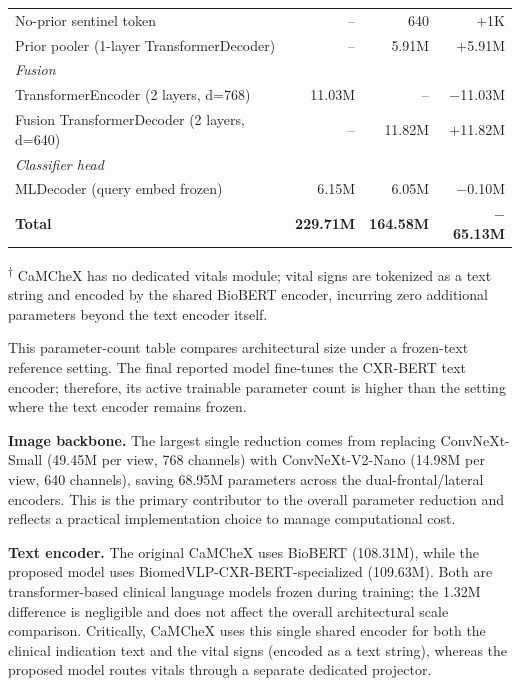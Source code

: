 \begin{table}[H]
{\begin{tabular}{lrrr}
        \quad No-prior sentinel token & -- & 640 & $+$1K \\
        \quad Prior pooler (1-layer TransformerDecoder) & -- & 5.91M & $+$5.91M \\
        \midrule
        \multicolumn{4}{l}{\textit{Fusion}} \\
        \quad TransformerEncoder (2 layers, d=768) & 11.03M & -- & $-$11.03M \\
        \quad Fusion TransformerDecoder (2 layers, d=640) & -- & 11.82M & $+$11.82M \\
        \midrule
        \multicolumn{4}{l}{\textit{Classifier head}} \\
        \quad MLDecoder (query embed frozen) & 6.15M & 6.05M & $-$0.10M \\
        \midrule
        \midrule
        \textbf{Total} & \textbf{229.71M} & \textbf{164.58M} & \textbf{$-$65.13M} \\
        \bottomrule
    \end{tabular}%
    }
\end{table}

{\small \textsuperscript{$\dagger$} CaMCheX has no dedicated vitals module; vital signs are tokenized as a text string and encoded by the shared BioBERT encoder, incurring zero additional parameters beyond the text encoder itself.}

This parameter-count table compares architectural size under a frozen-text reference setting. The final reported model fine-tunes the CXR-BERT text encoder; therefore, its active trainable parameter count is higher than the setting where the text encoder remains frozen.

\textbf{Image backbone.} The largest single reduction comes from replacing ConvNeXt-Small (49.45M per view, 768 channels) with ConvNeXt-V2-Nano (14.98M per view, 640 channels), saving 68.95M parameters across the dual-frontal/lateral encoders. This is the primary contributor to the overall parameter reduction and reflects a practical implementation choice to manage computational cost.

\textbf{Text encoder.} The original CaMCheX uses BioBERT (108.31M), while the proposed model uses BiomedVLP-CXR-BERT-specialized (109.63M). Both are transformer-based clinical language models frozen during training; the 1.32M difference is negligible and does not affect the overall architectural scale comparison. Critically, CaMCheX uses this single shared encoder for both the clinical indication text and the vital signs (encoded as a text string), whereas the proposed model routes vitals through a separate dedicated projector.

